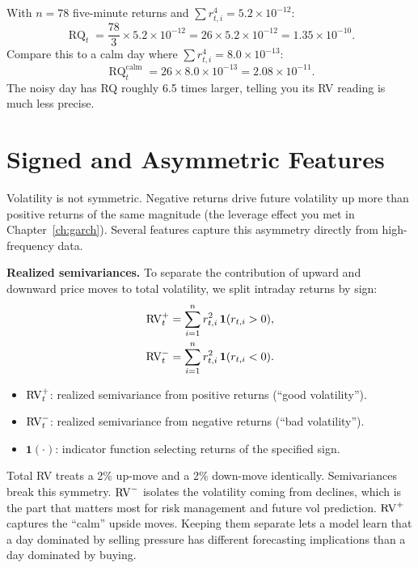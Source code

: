 \begin{workedexample}[Computing RQ]
With $n = 78$ five-minute returns and $\sum r_{t,i}^4 = 5.2 \times 10^{-12}$:
\[
\operatorname{RQ}_t = \frac{78}{3} \times 5.2 \times 10^{-12} = 26 \times 5.2 \times 10^{-12} = 1.35 \times 10^{-10}.
\]
Compare this to a calm day where $\sum r_{t,i}^4 = 8.0 \times 10^{-13}$:
\[
\operatorname{RQ}_t^{\text{calm}} = 26 \times 8.0 \times 10^{-13} = 2.08 \times 10^{-11}.
\]
The noisy day has RQ roughly 6.5 times larger, telling you its RV reading is much less precise.
\end{workedexample}

\section{Signed and Asymmetric Features}\label{sec:feat-signed}

Volatility is not symmetric.
Negative returns drive future volatility up more than positive returns of the same magnitude (the leverage effect you met in Chapter~\ref{ch:garch}).
Several features capture this asymmetry directly from high-frequency data.

\textbf{Realized semivariances.}
To separate the contribution of upward and downward price moves to total volatility, we split intraday returns by sign:
\begin{align}
\operatorname{RV}_t^+ &= \sum_{i=1}^{n} r_{t,i}^2 \,\mathbf{1}(r_{t,i} > 0), \label{eq:rs-plus}\\
\operatorname{RV}_t^- &= \sum_{i=1}^{n} r_{t,i}^2 \,\mathbf{1}(r_{t,i} < 0). \label{eq:rs-minus}
\end{align}
\begin{itemize}[nosep]
  \item $\operatorname{RV}_t^+$: realized semivariance from positive returns (``good volatility'').
  \item $\operatorname{RV}_t^-$: realized semivariance from negative returns (``bad volatility'').
  \item $\mathbf{1}(\cdot)$: indicator function selecting returns of the specified sign.
\end{itemize}

\begin{intuition}
Total RV treats a 2\% up-move and a 2\% down-move identically. Semivariances break this symmetry. $\operatorname{RV}^-$ isolates the volatility coming from declines, which is the part that matters most for risk management and future vol prediction. $\operatorname{RV}^+$ captures the ``calm'' upside moves. Keeping them separate lets a model learn that a day dominated by selling pressure has different forecasting implications than a day dominated by buying.
\end{intuition}

